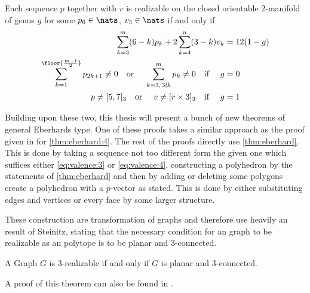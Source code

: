 \begin{theorem} \label{thm:eberhard:extended}
 Each sequence $p$ together with $v$ is realizable on the closed orientable $2$-manifold of genus $g$ for some $p_6 \in \nats$, $v_3 \in \nats$ if and only if
  \begin{align*}
    \sum_{k=3}^m (6-k)p_k + 2 \sum_{k=4}^n (3-k)v_k &= 12(1-g) \\
    \sum_{k=1}^{\floor{\frac{m-1}{2}}} p_{2k+1} \neq 0 \text{\quad or \quad} \sum_{k=3, \,3 \nmid k}^m p_k \neq 0 \text{\quad if \quad} g &= 0 \\
    p \neq [5, 7]_3 \text{\quad or \quad} v \neq [r\times3]_3 \text{\quad if \quad} g &= 1
  \end{align*}
\end{theorem}

Building upon these two, this thesis will present a bunch of new theorems of general Eberhards type. One of these proofs takes a similar approach as the proof given in \cite{ConvexPolytopes} for \autoref{thm:eberhard:4}. The rest of the proofs directly use \autoref{thm:eberhard}. This is done by taking a sequence not too different form the given one which suffices either \autoref{eq:valence:3} or \autoref{eq:valence:4}, constructing a polyhedron by the statements of \autoref{thm:eberhard} and then by adding or deleting some polygons create a polyhedron with a $p$-vector as stated. This is done by either substituting edges and vertices or every face by some larger structure. 

These construction are transformation of graphs and therefore use heavily an result of Steinitz, stating that the necessary condition for an graph to be realizable as an polytope is to be planar and $3$-connected.

\begin{theorem}\label{thm:steinitz}
  A Graph $G$ is $3$-realizable if and only if $G$ is planar and $3$-connected.
\end{theorem}
A proof of this theorem can also be found in \cite{ConvexPolytopes}.

